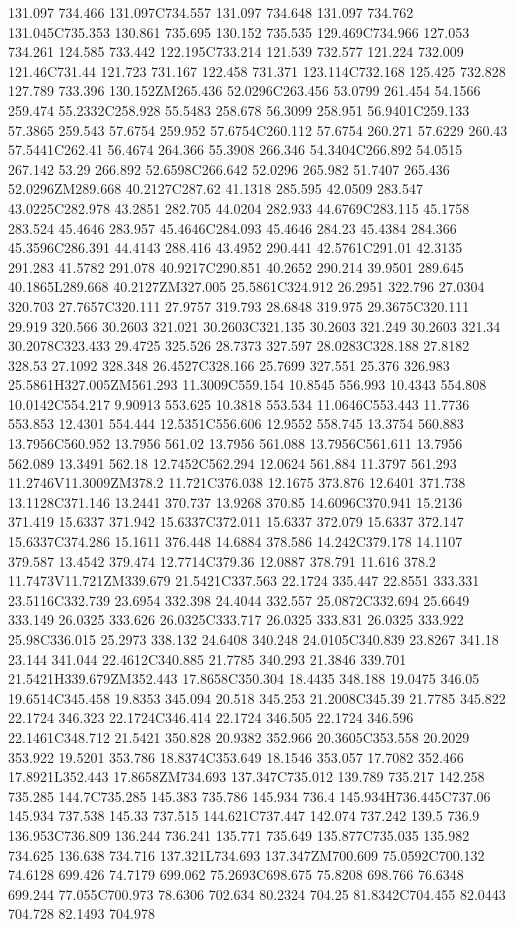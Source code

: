 131.097 734.466 131.097C734.557 131.097 734.648 131.097 734.762 131.045C735.353 130.861 735.695 130.152 735.535 129.469C734.966 127.053 734.261 124.585 733.442 122.195C733.214 121.539 732.577 121.224 732.009 121.46C731.44 121.723 731.167 122.458 731.371 123.114C732.168 125.425 732.828 127.789 733.396 130.152ZM265.436 52.0296C263.456 53.0799 261.454 54.1566 259.474 55.2332C258.928 55.5483 258.678 56.3099 258.951 56.9401C259.133 57.3865 259.543 57.6754 259.952 57.6754C260.112 57.6754 260.271 57.6229 260.43 57.5441C262.41 56.4674 264.366 55.3908 266.346 54.3404C266.892 54.0515 267.142 53.29 266.892 52.6598C266.642 52.0296 265.982 51.7407 265.436 52.0296ZM289.668 40.2127C287.62 41.1318 285.595 42.0509 283.547 43.0225C282.978 43.2851 282.705 44.0204 282.933 44.6769C283.115 45.1758 283.524 45.4646 283.957 45.4646C284.093 45.4646 284.23 45.4384 284.366 45.3596C286.391 44.4143 288.416 43.4952 290.441 42.5761C291.01 42.3135 291.283 41.5782 291.078 40.9217C290.851 40.2652 290.214 39.9501 289.645 40.1865L289.668 40.2127ZM327.005 25.5861C324.912 26.2951 322.796 27.0304 320.703 27.7657C320.111 27.9757 319.793 28.6848 319.975 29.3675C320.111 29.919 320.566 30.2603 321.021 30.2603C321.135 30.2603 321.249 30.2603 321.34 30.2078C323.433 29.4725 325.526 28.7373 327.597 28.0283C328.188 27.8182 328.53 27.1092 328.348 26.4527C328.166 25.7699 327.551 25.376 326.983 25.5861H327.005ZM561.293 11.3009C559.154 10.8545 556.993 10.4343 554.808 10.0142C554.217 9.90913 553.625 10.3818 553.534 11.0646C553.443 11.7736 553.853 12.4301 554.444 12.5351C556.606 12.9552 558.745 13.3754 560.883 13.7956C560.952 13.7956 561.02 13.7956 561.088 13.7956C561.611 13.7956 562.089 13.3491 562.18 12.7452C562.294 12.0624 561.884 11.3797 561.293 11.2746V11.3009ZM378.2 11.721C376.038 12.1675 373.876 12.6401 371.738 13.1128C371.146 13.2441 370.737 13.9268 370.85 14.6096C370.941 15.2136 371.419 15.6337 371.942 15.6337C372.011 15.6337 372.079 15.6337 372.147 15.6337C374.286 15.1611 376.448 14.6884 378.586 14.242C379.178 14.1107 379.587 13.4542 379.474 12.7714C379.36 12.0887 378.791 11.616 378.2 11.7473V11.721ZM339.679 21.5421C337.563 22.1724 335.447 22.8551 333.331 23.5116C332.739 23.6954 332.398 24.4044 332.557 25.0872C332.694 25.6649 333.149 26.0325 333.626 26.0325C333.717 26.0325 333.831 26.0325 333.922 25.98C336.015 25.2973 338.132 24.6408 340.248 24.0105C340.839 23.8267 341.18 23.144 341.044 22.4612C340.885 21.7785 340.293 21.3846 339.701 21.5421H339.679ZM352.443 17.8658C350.304 18.4435 348.188 19.0475 346.05 19.6514C345.458 19.8353 345.094 20.518 345.253 21.2008C345.39 21.7785 345.822 22.1724 346.323 22.1724C346.414 22.1724 346.505 22.1724 346.596 22.1461C348.712 21.5421 350.828 20.9382 352.966 20.3605C353.558 20.2029 353.922 19.5201 353.786 18.8374C353.649 18.1546 353.057 17.7082 352.466 17.8921L352.443 17.8658ZM734.693 137.347C735.012 139.789 735.217 142.258 735.285 144.7C735.285 145.383 735.786 145.934 736.4 145.934H736.445C737.06 145.934 737.538 145.33 737.515 144.621C737.447 142.074 737.242 139.5 736.9 136.953C736.809 136.244 736.241 135.771 735.649 135.877C735.035 135.982 734.625 136.638 734.716 137.321L734.693 137.347ZM700.609 75.0592C700.132 74.6128 699.426 74.7179 699.062 75.2693C698.675 75.8208 698.766 76.6348 699.244 77.055C700.973 78.6306 702.634 80.2324 704.25 81.8342C704.455 82.0443 704.728 82.1493 704.978 